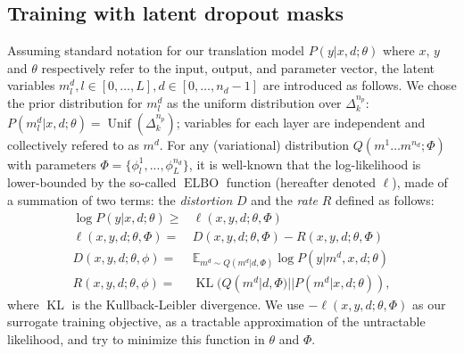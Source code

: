 \documentclass[11pt]{article}
\begin{document}
\subsection{Training with latent dropout masks}
Assuming standard notation for our translation model  $P(y|x,d;\theta)$ where $x$, $y$ and $\theta$ respectively refer to the input, output, and parameter vector, the latent variables $m_{l}^d, l \in[0,\dots,L], d \in [0, \dots, n_d-1]$ are introduced as follows. We chose the prior distribution for $m_{l}^d$ as the uniform distribution over $\Delta^{n_p}_k$: $P(m_l^d | x, d; \theta) = \operatorname{Unif}(\Delta^{n_p}_k)$; variables for each layer are independent and collectively refered to as $m^d$. For any (variational) distribution $Q(m^1 \dots m^{n_d}; \Phi)$ with parameters $\Phi=\{\phi_l^1, ..., \phi_L^{n_d}\}$, it is well-known that the log-likelihood is lower-bounded by the so-called $\operatorname{ELBO}$ function (hereafter denoted $\ell$), made of a summation of two terms: the \emph{distortion} $D$ and the \emph{rate} $R$ defined as follows:%
\begin{align}
  \log P(y|x,d;\theta) \ge & \ell(x,y,d; \theta, \Phi) \nonumber \\
  \ell(x,y,d; \theta, \Phi) =&  D(x,y,d; \theta, \Phi) - R(x,y,d; \theta, \Phi) \label{eq:lower-bound}\\
  D(x,y,d; \theta, \phi) = & \mathbb{E}_{m^d \sim Q(m^d |d,\Phi)} \log P(y | m^d, x, d; \theta) \nonumber\\
  R(x,y,d; \theta, \phi) = & \operatorname{KL}(Q(m^d | d, \Phi)||P(m^d | x,d; \theta)), \nonumber
\end{align}
where $\operatorname{KL}$ is the Kullback-Leibler divergence. We use $-\ell(x,y,d; \theta,\Phi)$ as our surrogate training objective, as a tractable approximation of the untractable likelihood, and try to minimize this function in $\theta$ and $\Phi$.
\end{document}
